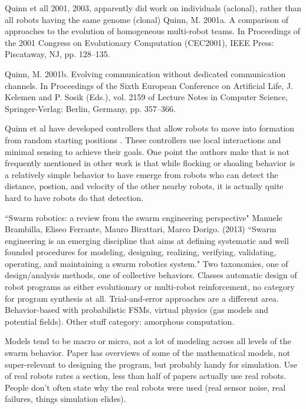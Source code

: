 \documentclass[]{article}
\begin{document}
\cite{quinn2001comparison} Quinn et all 2001, 2003, apparently did work on individuals (aclonal), rather than all robots having the same genome (clonal) Quinn, M. 2001a. A comparison of approaches to the evolution of homogeneous multi-robot teams. In Proceedings of the 2001 Congress on Evolutionary Computation (CEC2001), IEEE Press: Piscataway, NJ, pp. 128–135.

\cite{quinn2001evolving}Quinn, M. 2001b. Evolving communication without dedicated communication channels. In Proceedings of the Sixth European Conference on Artificial Life, J. Kelemen and P. Sosik (Eds.), vol. 2159 of Lecture Notes in Computer Science, Springer-Verlag: Berlin, Germany, pp. 357–366.

Quinn et al have developed controllers that allow robots to move into formation from random starting positions \cite{quinn2003evolving}. 
These controllers use local interactions and minimal sensing to achieve their goals. 
One point the authors make that is not frequently mentioned in other work is that while flocking or shoaling behavior is a relatively simple behavior to have emerge from robots who can detect the distance, postion, and velocity of the other nearby robots, it is actually quite hard to have robots do that detection. 


``Swarm robotics: a review from the swarm engineering perspective" \cite{brambilla2013swarm} Manuele Brambilla, Eliseo Ferrante, Mauro Birattari, Marco Dorigo. (2013) ``Swarm engineering is an emerging discipline that aims at defining systematic and well founded procedures for modeling, designing, realizing, verifying, validating, operating, and maintaining a swarm robotics system." Two taxonomies, one of design/analysis methods, one of collective behaviors. Classes automatic design of robot programs as either evolutionary or multi-robot reinforcement, no category for program synthesis at all. Trial-and-error approaches are a different area. Behavior-based with probabilistic FSMs, virtual physics (gas models and potential fields). Other stuff category: amorphous computation. 

Models tend to be macro or micro, not a lot of modeling across all levels of the swarm behavior. Paper has overviews of some of the mathematical models, not super-relevant to designing the program, but probably handy for simulation. Use of real robots rates a section, less than half of papers actually use real robots. People don't often state why the real robots were used (real sensor noise, real failures, things simulation elides). 
\end{document}
